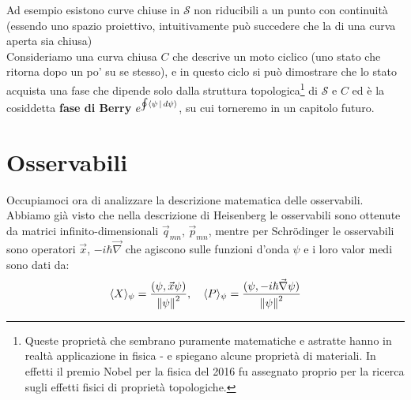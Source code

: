 \documentclass[FisicaTeorica.tex]{subfiles}
\begin{document}
\begin{enumerate}
	Ad esempio esistono curve chiuse in $\mathcal{S}$ non riducibili a un punto con continuità (essendo uno spazio proiettivo, intuitivamente può succedere che la  di una curva aperta sia chiusa)\\
	Consideriamo una curva chiusa $C$ che descrive un moto ciclico (uno stato che ritorna dopo un po' su se stesso), e in questo ciclo si può dimostrare che lo stato acquista una fase che dipende solo dalla struttura topologica\footnote{Queste proprietà che sembrano puramente matematiche e astratte hanno in realtà applicazione in fisica - e spiegano alcune proprietà di materiali. In effetti il premio Nobel per la fisica del 2016 fu assegnato proprio per la ricerca sugli effetti fisici di proprietà topologiche.} di $\mathcal{S}$ e $C$ ed è la cosiddetta \textbf{fase di Berry} $e^{\oint \Braket{\psi|d\psi}}$, su cui torneremo in un capitolo futuro. 
\end{enumerate}
	
\section{Osservabili}
Occupiamoci ora di analizzare la descrizione matematica delle osservabili.\\
Abbiamo già visto che nella descrizione di Heisenberg le osservabili sono ottenute da matrici infinito-dimensionali ${\vec{q}}_{mn}$, ${\vec{p}}_{mn}$, mentre per Schrödinger le osservabili sono operatori $\vec{x}$, $-i\hbar \vec{\nabla}$ che agiscono sulle funzioni d'onda $\psi$ e i loro valor medi sono dati da:
\[
\langle X\rangle_\psi = \frac{(\psi, \vec{x}\psi)}{\left\lVert\psi\right\rVert^2}, \quad \langle P\rangle_\psi = \frac{(\psi, -i\hbar \vec{\nabla}\psi)}{\left\lVert\psi\right\rVert^2}
\]
\end{document}
